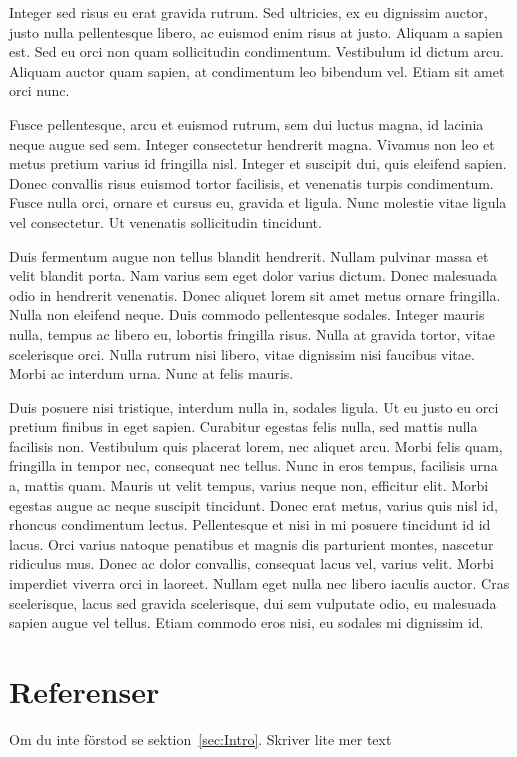 \documentclass[a4paper,10pt]{article}
\begin{document}
Integer sed risus eu erat gravida rutrum. Sed ultricies, ex eu dignissim auctor, justo nulla pellentesque libero, ac euismod enim risus at justo. Aliquam a sapien est. Sed eu orci non quam sollicitudin condimentum. Vestibulum id dictum arcu. Aliquam auctor quam sapien, at condimentum leo bibendum vel. Etiam sit amet orci nunc.

Fusce pellentesque, arcu et euismod rutrum, sem dui luctus magna, id lacinia neque augue sed sem. Integer consectetur hendrerit magna. Vivamus non leo et metus pretium varius id fringilla nisl. Integer et suscipit dui, quis eleifend sapien. Donec convallis risus euismod tortor facilisis, et venenatis turpis condimentum. Fusce nulla orci, ornare et cursus eu, gravida et ligula. Nunc molestie vitae ligula vel consectetur. Ut venenatis sollicitudin tincidunt.

Duis fermentum augue non tellus blandit hendrerit. Nullam pulvinar massa et velit blandit porta. Nam varius sem eget dolor varius dictum. Donec malesuada odio in hendrerit venenatis. Donec aliquet lorem sit amet metus ornare fringilla. Nulla non eleifend neque. Duis commodo pellentesque sodales. Integer mauris nulla, tempus ac libero eu, lobortis fringilla risus. Nulla at gravida tortor, vitae scelerisque orci. Nulla rutrum nisi libero, vitae dignissim nisi faucibus vitae. Morbi ac interdum urna. Nunc at felis mauris.

Duis posuere nisi tristique, interdum nulla in, sodales ligula. Ut eu justo eu orci pretium finibus in eget sapien. Curabitur egestas felis nulla, sed mattis nulla facilisis non. Vestibulum quis placerat lorem, nec aliquet arcu. Morbi felis quam, fringilla in tempor nec, consequat nec tellus. Nunc in eros tempus, facilisis urna a, mattis quam. Mauris ut velit tempus, varius neque non, efficitur elit. Morbi egestas augue ac neque suscipit tincidunt. Donec erat metus, varius quis nisl id, rhoncus condimentum lectus. Pellentesque et nisi in mi posuere tincidunt id id lacus. Orci varius natoque penatibus et magnis dis parturient montes, nascetur ridiculus mus. Donec ac dolor convallis, consequat lacus vel, varius velit. Morbi imperdiet viverra orci in laoreet. Nullam eget nulla nec libero iaculis auctor. Cras scelerisque, lacus sed gravida scelerisque, dui sem vulputate odio, eu malesuada sapien augue vel tellus. Etiam commodo eros nisi, eu sodales mi dignissim id.

\section{Referenser}
Om du inte förstod se sektion~\ref{sec:Intro}.
Skriver lite mer text
\end{document}
